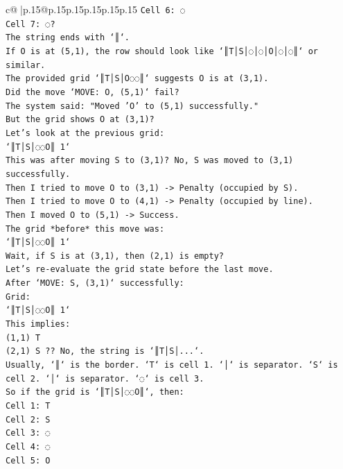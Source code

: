 \documentclass{article}
\begin{document}
{\begin{supertabular}{c@{$\;$}|p{.15\linewidth}@{}p{.15\linewidth}p{.15\linewidth}p{.15\linewidth}p{.15\linewidth}p{.15\linewidth}}
{{{\texttt{Cell 6: ◌} \\
\texttt{Cell 7: ◌?} \\
\texttt{The string ends with `║`.} \\
\texttt{If O is at (5,1), the row should look like `║T│S│◌│◌│O│◌│◌║` or similar.} \\
\texttt{The provided grid `║T│S│O◌◌║` suggests O is at (3,1).} \\
\texttt{Did the move `MOVE: O, (5,1)` fail?} \\
\texttt{The system said: "Moved 'O' to (5,1) successfully."} \\
\texttt{But the grid shows O at (3,1)?} \\
\texttt{Let's look at the previous grid:} \\
\texttt{`║T│S│◌◌O║ 1`} \\
\texttt{This was after moving S to (3,1)? No, S was moved to (3,1) successfully.} \\
\texttt{Then I tried to move O to (3,1) {-}> Penalty (occupied by S).} \\
\texttt{Then I tried to move O to (4,1) {-}> Penalty (occupied by line).} \\
\texttt{Then I moved O to (5,1) {-}> Success.} \\
\texttt{The grid *before* this move was:} \\
\texttt{`║T│S│◌◌O║ 1`} \\
\texttt{Wait, if S is at (3,1), then (2,1) is empty?} \\
\texttt{Let's re{-}evaluate the grid state before the last move.} \\
\texttt{After `MOVE: S, (3,1)` successfully:} \\
\texttt{Grid:} \\
\texttt{`║T│S│◌◌O║ 1`} \\
\texttt{This implies:} \\
\texttt{(1,1) T} \\
\texttt{(2,1) S ?? No, the string is `║T│S│...`.} \\
\texttt{Usually, `║` is the border. `T` is cell 1. `│` is separator. `S` is cell 2. `│` is separator. `◌` is cell 3.} \\
\texttt{So if the grid is `║T│S│◌◌O║`, then:} \\
\texttt{Cell 1: T} \\
\texttt{Cell 2: S} \\
\texttt{Cell 3: ◌} \\
\texttt{Cell 4: ◌} \\
\texttt{Cell 5: O} \\
}}}
\end{supertabular}}
\end{document}
